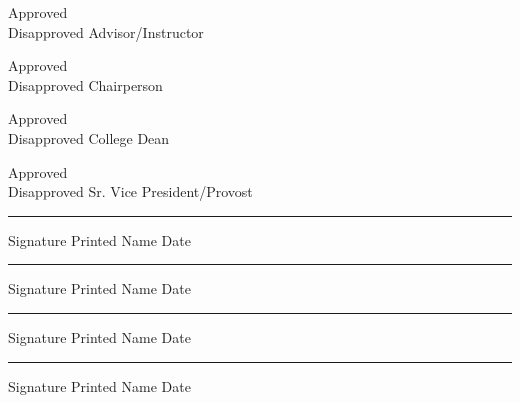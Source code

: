 \documentclass{article}
\begin{document}
\begin{Form}
\begin{multicols}{3}
\parbox{0.8\columnwidth}{
    Approved \\
    Disapproved \hspace{0.5cm}Advisor/Instructor 
    \vspace{0.2cm}

    Approved \\
    Disapproved \hspace{0.5cm}Chairperson 
    \vspace{0.2cm}

    Approved \\
    Disapproved \hspace{0.5cm}College Dean
    \vspace{0.2cm}

    Approved \\
    Disapproved \hspace{0.5cm}Sr. Vice President/Provost 
}

\columnbreak

\parbox{0.8\columnwidth}{
    \rule{3cm}{0.4pt}  
    \hspace{0.1cm} \TextField[name=p-name, width=3.5cm]{}
    \hspace{0.1cm} \TextField[name=o-date, width=1.5cm]{}
    \small Signature \hspace{1.8cm}\small Printed Name \hspace{1.8cm}\small Date

    \rule{3cm}{0.4pt}  
    \hspace{0.1cm} \TextField[name=p-name, width=3.5cm]{}
    \hspace{0.1cm} \TextField[name=o-date, width=1.5cm]{}
    \small Signature \hspace{1.8cm}\small Printed Name \hspace{1.8cm}\small Date

    \rule{3cm}{0.4pt}  
    \hspace{0.1cm} \TextField[name=p-name, width=3.5cm]{}
    \hspace{0.1cm} \TextField[name=o-date, width=1.5cm]{}
    \small Signature \hspace{1.8cm}\small Printed Name \hspace{1.8cm}\small Date

    \rule{3cm}{0.4pt}  
    \hspace{0.1cm} \TextField[name=p-name, width=3.5cm]{}
    \hspace{0.1cm} \TextField[name=o-date, width=1.5cm]{}
    \small Signature \hspace{1.8cm}\small Printed Name \hspace{1.8cm}\small Date

    
}

\columnbreak
\parbox{0.8\columnwidth}{
}

\end{multicols}

\end{Form}
\end{document}
